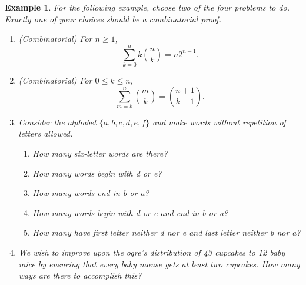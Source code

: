 \documentclass[11pt,titlepage]{article}		%
\theoremstyle{theorem}
\newtheorem{example}[theorem]{Example}
\begin{document}
\begin{example}
For the following example, choose two of the four problems to do. Exactly one of your choices should be a combinatorial proof.

\begin{enumerate}
    \item (Combinatorial) For $n\ge 1$,
    \[
        \sum\limits_{k=0}^n k \binom{n}{k} = n 2^{n-1}.
    \]
    
    \item (Combinatorial) For $0\le k \le n$,
    \[
        \sum\limits_{m=k}^n \binom{m}{k} = \binom{n+1}{k+1}.
    \]
    \item Consider the alphabet $\{a,b,c,d,e,f\}$ and make words without repetition of letters allowed.
        \begin{enumerate}
            \item How many six-letter words are there?
            \item How many words begin with \textit{d} or \textit{e}?
            \item How many words end in \textit{b} or \textit{a}?
            \item How many words begin with \textit{d} or \textit{e} and end in \textit{b} or \textit{a}?
            \item How many have first letter neither \textit{d} nor \textit{e} and last letter neither \textit{b} nor \textit{a}?
        \end{enumerate}
    \item We wish to improve upon the ogre's distribution of 43 cupcakes to 12 baby mice by ensuring that every baby mouse gets at least \textit{two} cupcakes. How many ways are there to accomplish this?
\end{enumerate}

\end{example}
\clearpage
\end{document}
